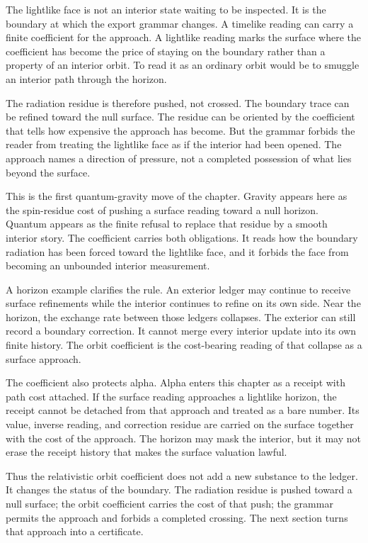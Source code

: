 The lightlike face is not an interior state waiting to be inspected. It is
the boundary at which the export grammar changes. A timelike reading can
carry a finite coefficient for the approach. A lightlike reading marks the
surface where the coefficient has become the price of staying on the
boundary rather than a property of an interior orbit. To read it as an
ordinary orbit would be to smuggle an interior path through the horizon.

The radiation residue is therefore pushed, not crossed. The boundary trace
can be refined toward the null surface. The residue can be oriented by the
coefficient that tells how expensive the approach has become. But the
grammar forbids the reader from treating the lightlike face as if the
interior had been opened. The approach names a direction of pressure, not a
completed possession of what lies beyond the surface.

This is the first quantum-gravity move of the chapter. Gravity appears here
as the spin-residue cost of pushing a surface reading toward a null horizon.
Quantum appears as the finite refusal to replace that residue by a smooth
interior story. The coefficient carries both obligations. It reads how the
boundary radiation has been forced toward the lightlike face, and it
forbids the face from becoming an unbounded interior measurement.

A horizon example clarifies the rule. An exterior ledger may continue to
receive surface refinements while the interior continues to refine on its
own side. Near the horizon, the exchange rate between those ledgers
collapses. The exterior can still record a boundary correction. It cannot
merge every interior update into its own finite history. The orbit
coefficient is the cost-bearing reading of that collapse as a surface
approach.

The coefficient also protects alpha. Alpha enters this chapter as a receipt
with path cost attached. If the surface reading approaches a lightlike
horizon, the receipt cannot be detached from that approach and treated as a
bare number. Its value, inverse reading, and correction residue are carried
on the surface together with the cost of the approach. The horizon may mask
the interior, but it may not erase the receipt history that makes the
surface valuation lawful.

Thus the relativistic orbit coefficient does not add a new substance to the
ledger. It changes the status of the boundary. The radiation residue is
pushed toward a null surface; the orbit coefficient carries the cost of that
push; the grammar permits the approach and forbids a completed crossing. The
next section turns that approach into a certificate.


